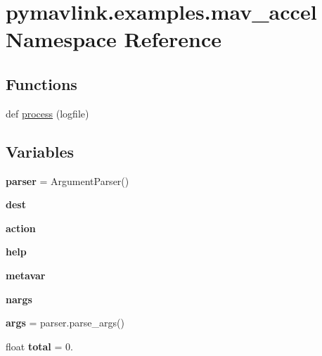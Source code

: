 \hypertarget{namespacepymavlink_1_1examples_1_1mav__accel}{}\section{pymavlink.\+examples.\+mav\+\_\+accel Namespace Reference}
\label{namespacepymavlink_1_1examples_1_1mav__accel}
\subsection*{Functions}
\begin{DoxyCompactItemize}
\item 
def \hyperlink{namespacepymavlink_1_1examples_1_1mav__accel_a07d793cb12eb94760b538aa704c189cb}{process} (logfile)
\end{DoxyCompactItemize}
\subsection*{Variables}
\begin{DoxyCompactItemize}
\item 
\mbox{\label{namespacepymavlink_1_1examples_1_1mav__accel_ac7f55cd428b0d2655e2b7a0c26681c87}} 
{\bfseries parser} = Argument\+Parser()
\item 
\mbox{\label{namespacepymavlink_1_1examples_1_1mav__accel_a357cf3f2ae5ff9dcd81f017aef010c34}} 
{\bfseries dest}
\item 
\mbox{\label{namespacepymavlink_1_1examples_1_1mav__accel_a8549081c246e62cff385bda66571ebb1}} 
{\bfseries action}
\item 
\mbox{\label{namespacepymavlink_1_1examples_1_1mav__accel_ad61483ef0eae718bad575288f1155111}} 
{\bfseries help}
\item 
\mbox{\label{namespacepymavlink_1_1examples_1_1mav__accel_a4fca8d8f336cfd732f86d0a140d1bd37}} 
{\bfseries metavar}
\item 
\mbox{\label{namespacepymavlink_1_1examples_1_1mav__accel_a10cdf009f829912434de693526228471}} 
{\bfseries nargs}
\item 
\mbox{\label{namespacepymavlink_1_1examples_1_1mav__accel_a4374be8950d5232a486e8d67b634c367}} 
{\bfseries args} = parser.\+parse\+\_\+args()
\item 
\mbox{\label{namespacepymavlink_1_1examples_1_1mav__accel_aedd60df344a807b8ea3d53d4bb88a246}} 
float {\bfseries total} = 0.
\end{DoxyCompactItemize}


